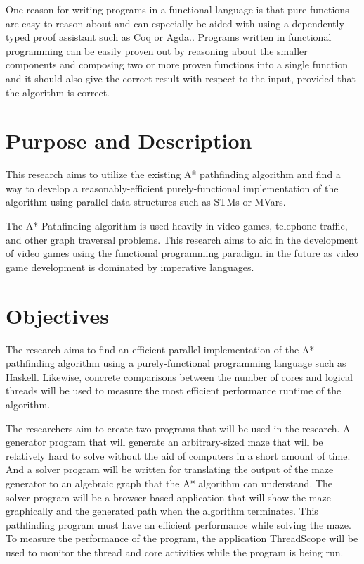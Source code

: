One reason for writing programs in a functional language is that 
pure functions are easy to reason about and can especially be aided with 
using a dependently-typed proof assistant such as Coq
or Agda.\cite{Breitner2018,SpectorZabusky2018,ElBakouny2017}.
Programs written in functional programming can be easily proven out 
by reasoning about the smaller components and composing two or more proven 
functions into a single function and it should also give the correct result with respect to the input,
provided that the algorithm is correct. \cite{AbelBenkeBove2005}

\section{Purpose and Description}

This research aims to utilize the existing A* pathfinding algorithm
\cite{ZaghloulAlJami2017,WeinstockHolladay}
and find a way to develop a reasonably-efficient purely-functional 
implementation of the algorithm using parallel data structures such 
as STMs or MVars\cite{Marlow2013}.  

The A* Pathfinding algorithm is used heavily in video games, telephone traffic, 
and other graph traversal problems\cite{HartNilssonRaphael1968}. This research 
aims to aid in the development of video games using the functional 
programming paradigm in the future as video game development is dominated 
by imperative languages.

\section{Objectives}
The research aims to find an efficient parallel implementation of the A* pathfinding 
algorithm using a purely-functional programming language such as Haskell. Likewise, 
concrete comparisons between the number of cores and logical threads will be used to measure 
the most efficient performance runtime of the algorithm.

The researchers aim to create two programs that will be used in the research. A generator program
that will generate an arbitrary-sized maze that will be relatively hard to solve without the aid 
of computers in a short amount of time. And a solver program will be written for translating the output 
of the maze generator to an algebraic graph that the A* algorithm can understand. The solver
program will be a browser-based application that will show the maze graphically and the generated 
path when the algorithm terminates. This pathfinding program must have an efficient performance while solving the maze. 
To measure the performance of the program, the application ThreadScope will be used to monitor the thread and
core activities while the program is being run. \cite{ThreadScope}
